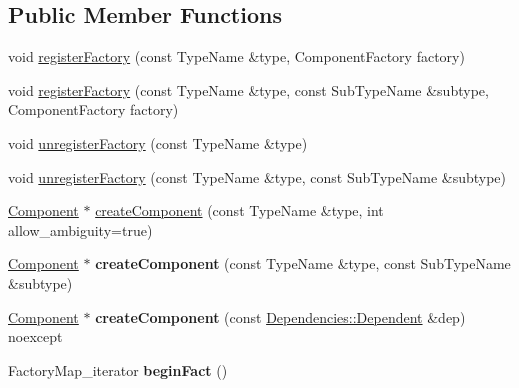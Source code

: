 \subsection*{Public Member Functions}
\begin{DoxyCompactItemize}
\item 
void \hyperlink{classtheoria_1_1core_1_1Registry_ac7cd0cefa7207f2f6c602723cc32ee49}{register\+Factory} (const Type\+Name \&type, Component\+Factory factory)
\item 
void \hyperlink{classtheoria_1_1core_1_1Registry_a861b9906b6e10bdebc74ec7397ea971a}{register\+Factory} (const Type\+Name \&type, const Sub\+Type\+Name \&subtype, Component\+Factory factory)
\item 
void \hyperlink{classtheoria_1_1core_1_1Registry_a07940fe9f04fa89130432610d02aa0df}{unregister\+Factory} (const Type\+Name \&type)
\item 
void \hyperlink{classtheoria_1_1core_1_1Registry_aabfbd64902458b12cfd7bd20cf400837}{unregister\+Factory} (const Type\+Name \&type, const Sub\+Type\+Name \&subtype)
\item 
\hyperlink{classtheoria_1_1core_1_1Component}{Component} $\ast$ \hyperlink{classtheoria_1_1core_1_1Registry_a846b6ea01b2c4d3d1276796e9ef2b32b}{create\+Component} (const Type\+Name \&type, int allow\+\_\+ambiguity=true)
\item 
\mbox{\label{classtheoria_1_1core_1_1Registry_a22ddcd3c1f46bd171cb9d704889a8a07}} 
\hyperlink{classtheoria_1_1core_1_1Component}{Component} $\ast$ {\bfseries create\+Component} (const Type\+Name \&type, const Sub\+Type\+Name \&subtype)
\item 
\mbox{\label{classtheoria_1_1core_1_1Registry_aab152e6e19be2b33f13bb82e77aca917}} 
\hyperlink{classtheoria_1_1core_1_1Component}{Component} $\ast$ {\bfseries create\+Component} (const \hyperlink{structtheoria_1_1core_1_1Dependencies_1_1Dependent}{Dependencies\+::\+Dependent} \&dep) noexcept
\item 
\mbox{\label{classtheoria_1_1core_1_1Registry_a0a7c747a611355e212e026e128acd322}} 
Factory\+Map\+\_\+iterator {\bfseries begin\+Fact} ()
\item 
\mbox{\label{classtheoria_1_1core_1_1Registry_ac88948c696663ae6f7ba3ece5c2fdcc9}} 

\end{DoxyCompactItemize}
